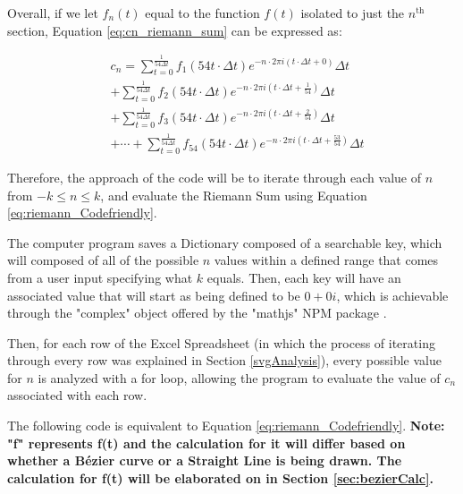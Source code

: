 \documentclass[letterpaper, 12pt]{article}
\begin{document}
Overall, if we let \(f_n(t)\) equal to the function \(f(t)\) isolated
to just the \(n^{\text{th}}\) section,
Equation \ref*{eq:cn_riemann_sum} can
be expressed as:

\begin{equation}
    \begin{aligned} \label{eq:riemann_Codefriendly}
         & c_n = \sum_{t = 0}^{\frac{1}{54\Delta t}} f_1(54t \cdot \Delta t) e^{-n \cdot 2\pi i(t \cdot \Delta t + 0)} \Delta t
        \\
         & + \sum_{t = 0}^{\frac{1}{54\Delta t}} f_2(54t \cdot \Delta t) e^{-n \cdot 2\pi i(t \cdot \Delta t + \frac{1}{54})} \Delta t
        \\
         & + \sum_{t = 0}^{\frac{1}{54\Delta t}} f_3(54t \cdot \Delta t) e^{-n \cdot 2\pi i(t \cdot \Delta t + \frac{2}{54})} \Delta t
        \\
         & + \cdots +
        \sum_{t = 0}^{\frac{1}{54\Delta t}} f_{54}(54t \cdot \Delta t) e^{-n \cdot 2\pi i(t \cdot \Delta t + \frac{53}{54})} \Delta t
    \end{aligned}
\end{equation}

Therefore, the approach of the code will be to iterate through
each value of \(n\) from \(-k \le n \le k\), and evaluate
the Riemann Sum using Equation \ref*{eq:riemann_Codefriendly}.

The computer program saves a Dictionary composed of a searchable key,
which will composed of all of the possible \(n\) values within
a defined range that comes from a user input specifying what
\(k\) equals. Then, each key will have an associated value
that will start as being defined to be \(0 + 0i\), which
is achievable through the "complex" object offered by the
"mathjs" NPM package \cite{dejongMathjs}.

Then, for each row of the Excel Spreadsheet (in which the process of
iterating through every row was explained in Section \ref*{svgAnalysis}),
every possible value for \(n\) is analyzed with a for loop,
allowing the program to evaluate the value of \(c_n\) associated with
each row.

The following code is equivalent to Equation \ref*{eq:riemann_Codefriendly}.
\textbf{Note: "f" represents f(t) and
    the calculation for it will differ based on whether
    a Bézier curve or a Straight Line is being drawn.
    The calculation for f(t) will be elaborated on in
    Section \ref*{sec:bezierCalc}.}
\end{document}
